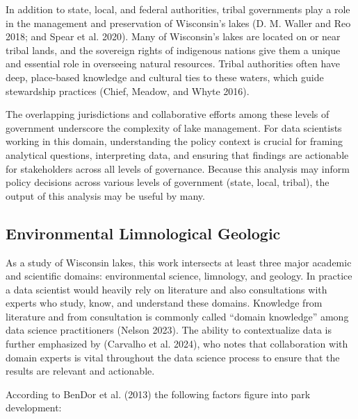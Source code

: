 \documentclass[
]{article}
\begin{document}
In addition to state, local, and federal authorities, tribal governments
play a role in the management and preservation of Wisconsin's lakes (D.
M. Waller and Reo 2018; and Spear et al. 2020). Many of Wisconsin's
lakes are located on or near tribal lands, and the sovereign rights of
indigenous nations give them a unique and essential role in overseeing
natural resources. Tribal authorities often have deep, place-based
knowledge and cultural ties to these waters, which guide stewardship
practices (Chief, Meadow, and Whyte 2016).

The overlapping jurisdictions and collaborative efforts among these
levels of government underscore the complexity of lake management. For
data scientists working in this domain, understanding the policy context
is crucial for framing analytical questions, interpreting data, and
ensuring that findings are actionable for stakeholders across all levels
of governance. Because this analysis may inform policy decisions across
various levels of government (state, local, tribal), the output of this
analysis may be useful by many.

\subsection{Environmental Limnological
Geologic}\label{environmental-limnological-geologic}

As a study of Wisconsin lakes, this work intersects at least three major
academic and scientific domains: environmental science, limnology, and
geology. In practice a data scientist would heavily rely on literature
and also consultations with experts who study, know, and understand
these domains. Knowledge from literature and from consultation is
commonly called ``domain knowledge'' among data science practitioners
(Nelson 2023). The ability to contextualize data is further emphasized
by (Carvalho et al. 2024), who notes that collaboration with domain
experts is vital throughout the data science process to ensure that the
results are relevant and actionable.

According to BenDor et al. (2013) the following factors figure into park
development:
\end{document}
